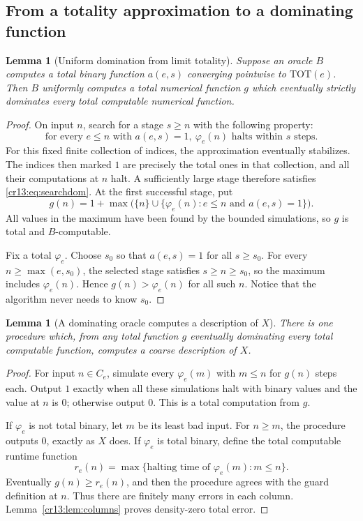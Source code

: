 \documentclass[11pt,letterpaper]{article}
\newtheorem{lemma}[theorem]{Lemma}
\theoremstyle{definition}
\theoremstyle{remark}\newtheorem{remark}[theorem]{Remark}
\numberwithin{equation}{section}
\newcommand{\TOT}{\mathrm{TOT}}
\begin{document}
\subsection{From a totality approximation to a dominating function}
\begin{lemma}[Uniform domination from limit totality]\label{cr13:lem:domination}
Suppose an oracle $B$ computes a total binary function $a(e,s)$ converging pointwise to $\TOT(e)$. Then $B$ uniformly computes a total numerical function $g$ which eventually strictly dominates every total computable numerical function.
\end{lemma}
\begin{proof}
On input $n$, search for a stage $s\ge n$ with the following property:
\begin{equation}\label{cr13:eq:searchdom}
  \text{for every }e\le n\text{ with }a(e,s)=1,
       \ \varphi_e(n)\text{ halts within }s\text{ steps}.
\end{equation}
For this fixed finite collection of indices, the approximation eventually stabilizes. The indices then marked $1$ are precisely the total ones in that collection, and all their computations at $n$ halt. A sufficiently large stage therefore satisfies \eqref{cr13:eq:searchdom}. At the first successful stage, put
\begin{equation}\label{cr13:eq:g}
 g(n)=1+\max\bigl(\{n\}\cup
       \{\varphi_e(n):e\le n\text{ and }a(e,s)=1\}\bigr).
\end{equation}
All values in the maximum have been found by the bounded simulations, so $g$ is total and $B$-computable.

Fix a total $\varphi_e$. Choose $s_0$ so that $a(e,s)=1$ for all $s\ge s_0$. For every $n\ge\max(e,s_0)$, the selected stage satisfies $s\ge n\ge s_0$, so the maximum includes $\varphi_e(n)$. Hence $g(n)>\varphi_e(n)$ for all such $n$. Notice that the algorithm never needs to know $s_0$.
\end{proof}

\begin{lemma}[A dominating oracle computes a description of $X$]\label{cr13:lem:domtoX}
There is one procedure which, from any total function $g$ eventually dominating every total computable function, computes a coarse description of $X$.
\end{lemma}
\begin{proof}
For input $n\in C_e$, simulate every $\varphi_e(m)$ with $m\le n$ for $g(n)$ steps each. Output $1$ exactly when all these simulations halt with binary values and the value at $n$ is $0$; otherwise output $0$. This is a total computation from $g$.

If $\varphi_e$ is not total binary, let $m$ be its least bad input. For $n\ge m$, the procedure outputs $0$, exactly as $X$ does. If $\varphi_e$ is total binary, define the total computable runtime function
\[
 r_e(n)=\max\{\text{halting time of }\varphi_e(m):m\le n\}.
\]
Eventually $g(n)\ge r_e(n)$, and then the procedure agrees with the guard definition at $n$. Thus there are finitely many errors in each column. Lemma~\ref{cr13:lem:columns} proves density-zero total error.
\end{proof}
\end{document}
